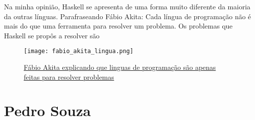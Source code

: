 \documentclass[
  article,			       %
  12pt,				         %
  oneside,			       %
  a4paper,			       %
  english,		       	 %
  brazil,			      	 %
  sumario=tradicional
]{abntex2}
\begin{document}
\begin{apendicesenv}
        Na minha opinião, Haskell se apresenta de uma forma muito diferente da maioria da outras línguas. 
        Parafraseando Fábio Akita: Cada língua de programação não é mais do que uma ferramenta
        para resolver um problema. Os problemas que Haskell se propôs a resolver são

        \begin{figure}[ht]
          \texttt{[image: fabio\_akita\_lingua.png]}
          \caption{\href{https://www.youtube.com/watch?v=p9-WuJbVHHc}{Fábio Akita explicando que linguas de programação são apenas feitas para resolver problemas}}
        \end{figure}

        \newpage

        \chapter{Pedro Souza}




    
    \end{apendicesenv}
\end{document}
